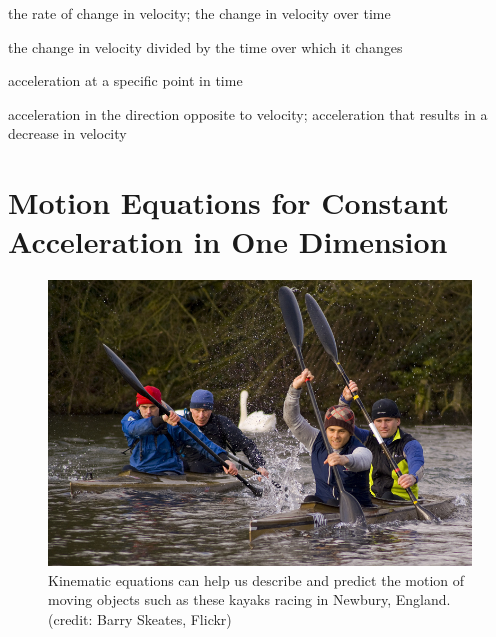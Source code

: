 \documentclass[
]{book}
\providecommand{\tightlist}{%
  \setlength{\itemsep}{0pt}\setlength{\parskip}{0pt}}
\begin{document}
\begin{description}
\tightlist
\item[acceleration]
the rate of change in velocity; the change in velocity over time
\end{description}

\begin{description}
\tightlist
\item[average acceleration]
the change in velocity divided by the time over which it changes
\end{description}

\begin{description}
\tightlist
\item[instantaneous acceleration]
acceleration at a specific point in time
\end{description}

\begin{description}
\tightlist
\item[deceleration]
acceleration in the direction opposite to velocity; acceleration
that results in a decrease in velocity
\end{description}

\hypertarget{motion-equations-for-constant-acceleration-in-one-dimension}{%
\section{Motion Equations for Constant Acceleration in One Dimension}\label{motion-equations-for-constant-acceleration-in-one-dimension}}

\begin{figure}
\hypertarget{import-auto-id1489960}{%
\centering
\includegraphics{images/Figure_02_05_00.jpg}
\caption{Kinematic equations can help us describe and predict the motion of
moving objects such as these kayaks racing in Newbury, England. (credit:
Barry Skeates,
Flickr)}\label{import-auto-id1489960}
}
\end{figure}
\end{document}
